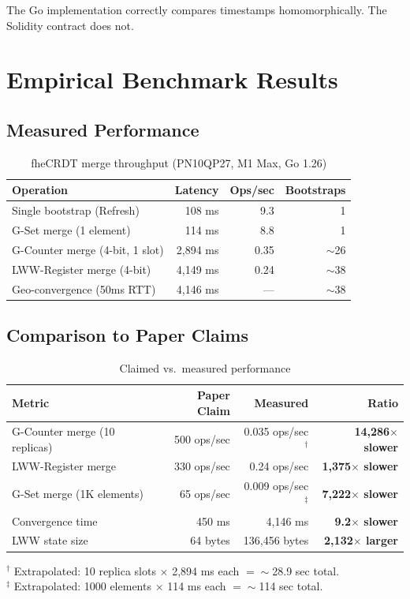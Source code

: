 \documentclass{../shared/luxfhe}
\begin{document}
The Go implementation correctly compares timestamps homomorphically.
The Solidity contract does not.

\section{Empirical Benchmark Results}

\subsection{Measured Performance}

\begin{table}[h]
\centering
\caption{fheCRDT merge throughput (PN10QP27, M1 Max, Go 1.26)}
\label{tab:bench}
\begin{tabular}{lrrr}
\toprule
Operation & Latency & Ops/sec & Bootstraps \\
\midrule
Single bootstrap (Refresh)      & 108 ms  & 9.3     & 1 \\
G-Set merge (1 element)         & 114 ms  & 8.8     & 1 \\
G-Counter merge (4-bit, 1 slot) & 2,894 ms & 0.35   & $\sim$26 \\
LWW-Register merge (4-bit)      & 4,149 ms & 0.24   & $\sim$38 \\
Geo-convergence (50ms RTT)      & 4,146 ms & ---     & $\sim$38 \\
\bottomrule
\end{tabular}
\end{table}

\subsection{Comparison to Paper Claims}

\begin{table}[h]
\centering
\caption{Claimed vs.\ measured performance}
\label{tab:delta}
\begin{tabular}{lrrr}
\toprule
Metric & Paper Claim & Measured & Ratio \\
\midrule
G-Counter merge (10 replicas) & 500 ops/sec & 0.035 ops/sec$^\dagger$ & \textbf{14,286$\times$ slower} \\
LWW-Register merge            & 330 ops/sec & 0.24 ops/sec             & \textbf{1,375$\times$ slower} \\
G-Set merge (1K elements)     & 65 ops/sec  & 0.009 ops/sec$^\ddagger$ & \textbf{7,222$\times$ slower} \\
Convergence time              & 450 ms      & 4,146 ms                 & \textbf{9.2$\times$ slower} \\
LWW state size                & 64 bytes    & 136,456 bytes            & \textbf{2,132$\times$ larger} \\
\bottomrule
\end{tabular}

\footnotesize
$^\dagger$ Extrapolated: 10 replica slots $\times$ 2,894 ms each $= \sim$28.9 sec total.\\
$^\ddagger$ Extrapolated: 1000 elements $\times$ 114 ms each $= \sim$114 sec total.
\end{table}
\end{document}
